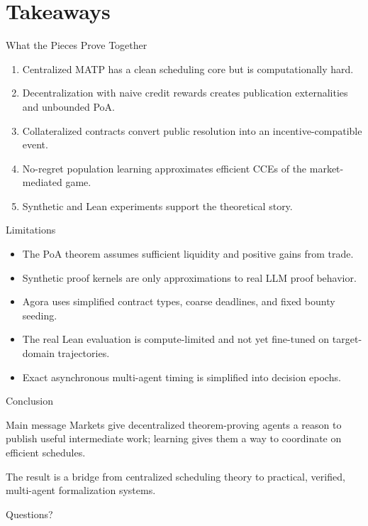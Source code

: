 \documentclass[10pt,aspectratio=169]{beamer}
\begin{document}
\section{Takeaways}

\begin{frame}{What the Pieces Prove Together}
\small
\begin{enumerate}
  \item Centralized MATP has a clean scheduling core but is computationally hard.
  \item Decentralization with naive credit rewards creates publication externalities and unbounded PoA.
  \item Collateralized contracts convert public resolution into an incentive-compatible event.
  \item No-regret population learning approximates efficient CCEs of the market-mediated game.
  \item Synthetic and Lean experiments support the theoretical story.
\end{enumerate}
\end{frame}

\begin{frame}{Limitations}
\small
\begin{itemize}
  \item The PoA theorem assumes sufficient liquidity and positive gains from trade.
  \item Synthetic proof kernels are only approximations to real LLM proof behavior.
  \item Agora uses simplified contract types, coarse deadlines, and fixed bounty seeding.
  \item The real Lean evaluation is compute-limited and not yet fine-tuned on target-domain trajectories.
  \item Exact asynchronous multi-agent timing is simplified into decision epochs.
\end{itemize}
\end{frame}

\begin{frame}{Conclusion}
\large
\begin{block}{Main message}
Markets give decentralized theorem-proving agents a reason to publish useful intermediate work; learning gives them a way to coordinate on efficient schedules.
\end{block}

\vspace{1em}
\normalsize
The result is a bridge from centralized scheduling theory to practical, verified, multi-agent formalization systems.
\end{frame}

\begin{frame}[standout]
Questions?
\end{frame}
\end{document}
